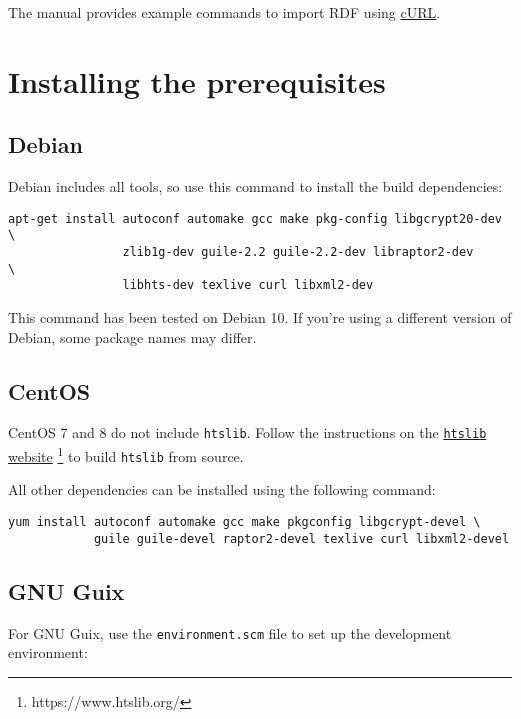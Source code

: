   The manual provides example commands to import RDF using
  \href{https://curl.haxx.se/}{cURL}.

\section{Installing the prerequisites}

\subsection{Debian}

  Debian includes all tools, so use this command to install the
  build dependencies:

\begin{siderules}
\begin{verbatim}
apt-get install autoconf automake gcc make pkg-config libgcrypt20-dev   \
                zlib1g-dev guile-2.2 guile-2.2-dev libraptor2-dev       \
                libhts-dev texlive curl libxml2-dev
\end{verbatim}
\end{siderules}

  This command has been tested on Debian 10.  If you're using a different
  version of Debian, some package names may differ.

\subsection{CentOS}

  CentOS 7 and 8 do not include \texttt{htslib}.  Follow the instructions on
  the \href{https://www.htslib.org/}{\texttt{htslib} website}%
  \footnote{https://www.htslib.org/} to build \texttt{htslib} from source.

  All other dependencies can be installed using the following command:

\begin{siderules}
\begin{verbatim}
yum install autoconf automake gcc make pkgconfig libgcrypt-devel \
            guile guile-devel raptor2-devel texlive curl libxml2-devel
\end{verbatim}
\end{siderules}

\subsection{GNU Guix}

  For GNU Guix, use the \texttt{environment.scm} file to set up the development
  environment:

